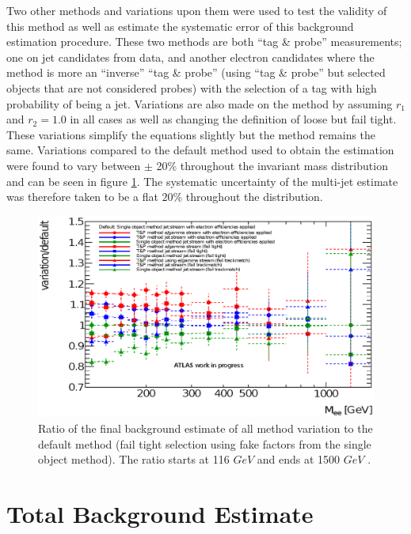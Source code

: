 Two other methods and variations upon them were used to test the validity of this method as well as estimate the systematic error of this background estimation procedure. These two methods are both ``tag \& probe'' measurements; one on jet candidates from data, and another electron candidates where the method is more an ``inverse'' ``tag \& probe'' (using ``tag \& probe'' but selected objects that are not considered probes) with the selection of a tag with high probability of being a jet. Variations are also made on the method by assuming $r_{1}$ and $r_{2} = 1.0$ in all cases as well as changing the definition of loose but fail tight. These variations simplify the equations slightly but the method remains the same. Variations compared to the default method used to obtain the estimation were found to vary between $\pm$ 20\% throughout the invariant mass distribution and can be seen in figure \ref{fig:MJsys}. The systematic uncertainty of the multi-jet estimate was therefore taken to be a flat $20\%$ throughout the distribution.


   \begin{figure}[h]
      \begin{center}
      \includegraphics[width=0.98\linewidth]{images/ff_bkg_variation.eps}
      \end{center}
   \caption{Ratio of the final background estimate of all method variation to the default method (fail tight selection using fake factors from the single object method). The ratio starts at 116 $GeV$ and ends at 1500 $GeV$ \cite{Z':1564935}.}
   \label{fig:MJsys}
   \end{figure}





\section{Total Background Estimate}

